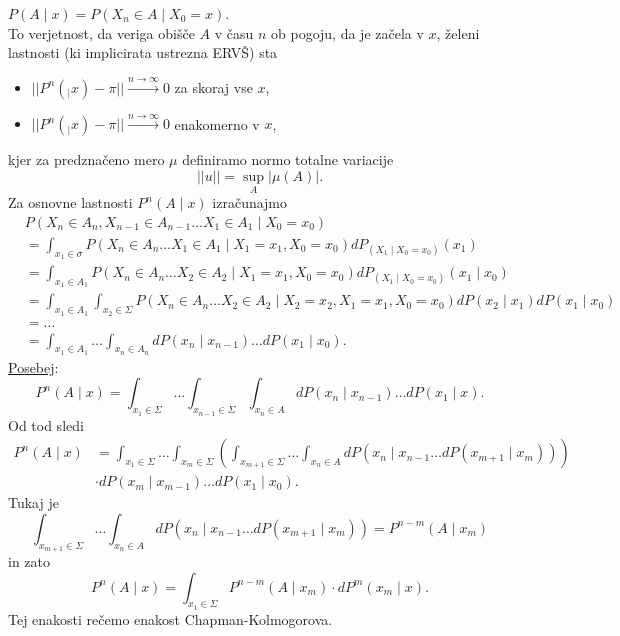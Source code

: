 \documentclass[a4paper, 12pt]{book}
\theoremstyle{definition}
\theoremstyle{remark}
\begin{document}
$P(A \mid x) = P(X_n \in A \mid X_0 = x)$. \\
To verjetnost, da veriga obišče $A$ v času $n$ ob pogoju, da je začela v $x$,
želeni lastnosti (ki implicirata ustrezna ERVŠ) sta
\begin{itemize}
  \item $||P^n(_ \mid x) - \pi|| \stackrel{n \to \infty}{\to} 0$ za skoraj vse $x$,
  \item $||P^n(_ \mid x) - \pi|| \stackrel{n \to \infty}{\to} 0$ enakomerno v $x$,
\end{itemize}
kjer za predznačeno mero $\mu$ definiramo normo totalne variacije
\begin{equation*}
  || u || = \sup_A |\mu(A)|.
\end{equation*}
Za osnovne lastnosti $P^n(A \mid x)$ izračunajmo
\begin{align*}
  &P(X_n \in A_n, X_{n-1} \in A_{n-1} \dots X_1 \in A_1 \mid X_0=x_0) \\
  &=\int_{x_1 \in \sigma} P(X_n \in A_n \dots X_1 \in A_1 \mid X_1=x_1, X_0=x_0) dP_{(X_1 \mid X_0=x_0)}(x_1) \\
  &=\int_{x_1 \in A_1} P(X_n \in A_n \dots X_2 \in A_2 \mid X_1=x_1, X_0=x_0) dP_{(X_1 \mid X_0=x_0)}(x_1 \mid x_0) \\
  &=\int_{x_1 \in A_1} \int_{x_2 \in \Sigma}
    P(X_n \in A_n \dots X_2 \in A_2 \mid X_2=x_2, X_1=x_1, X_0=x_0) dP(x_2 \mid x_1) dP(x_1 \mid x_0) \\
  &= \dots \\
  &= \int_{x_1 \in A_1} \dots \int_{x_n \in A_n} dP(x_n \mid x_{n-1}) \dots dP(x_1 \mid x_0).
\end{align*}
\underline{Posebej}:
\begin{equation*}
  P^n(A \mid x) = \int_{x_1 \in \Sigma} \dots \int_{x_{n-1} \in \Sigma} \int_{x_n \in A}
    dP(x_n \mid x_{n-1}) \dots dP(x_1 \mid x).
\end{equation*}
Od tod sledi
\begin{align*}
  P^n(A \mid x) &= \int_{x_1 \in \Sigma} \dots \int_{x_m \in \Sigma}
    \left(\int_{x_{m+1} \in \Sigma} \dots \int_{x_n \in A} dP(x_n \mid x_{n-1} \dots dP(x_{m+1} \mid x_m))\right) \\
  &\cdot dP(x_m \mid x_{m-1}) \dots dP(x_1 \mid x_0).
\end{align*}
Tukaj je
\begin{equation*}
  \int_{x_{m+1} \in \Sigma} \dots \int_{x_n \in A} dP(x_n \mid x_{n-1} \dots dP(x_{m+1} \mid x_m)) = P^{n-m}(A \mid x_m)
\end{equation*}
in zato
\begin{equation*}
  P^n(A \mid x) = \int_{x_1 \in \Sigma} P^{n-m} (A \mid x_m) \cdot dP^m(x_m \mid x).
\end{equation*}
Tej enakosti rečemo enakost Chapman-Kolmogorova.
\end{document}
